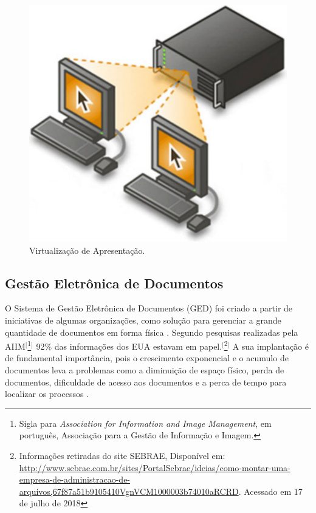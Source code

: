 \begin{itemize}
    \begin{figure}[htb]
    	\caption{\label{fig:virt_apre}Virtualização de Apresentação.}
    	\begin{center}
    	    \includegraphics[scale=0.29]{imagens/virtualizacao-apresentacao.jpg}
    	\end{center}
    \end{figure}

\end{itemize}

\subsection{Gestão Eletrônica de Documentos}

O Sistema de Gestão Eletrônica de Documentos (GED) foi criado a partir de iniciativas de algumas organizações, como solução para gerenciar a grande quantidade de documentos em forma física \cite{da2003ged}. Segundo pesquisas realizadas pela AIIM$^{[}$\footnote{Sigla para \textit{Association for Information and Image Management}, em português, Associação para a Gestão de Informação e Imagem.}$^{]}$ 92\% das informações dos EUA estavam em papel.$^{[}$\footnote{Informações retiradas do site SEBRAE, Disponível em: \url{http://www.sebrae.com.br/sites/PortalSebrae/ideias/como-montar-uma-empresa-de-administracao-de-arquivos,67f87a51b9105410VgnVCM1000003b74010aRCRD}. Acessado em 17 de julho de 2018}$^{]}$ A sua implantação é de fundamental importância, pois o crescimento exponencial e o acumulo de documentos leva a problemas como a diminuição de espaço físico, perda de documentos, dificuldade de acesso aos documentos e a perca de tempo para localizar os processos \cite{menezes2016ged}.

